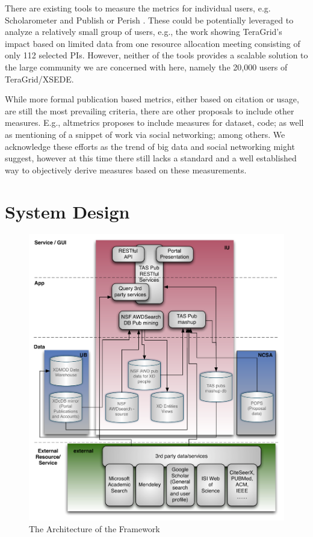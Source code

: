 \documentclass{sig-alternate}
\begin{document}
There are existing tools to measure the metrics for individual users, e.g. Scholarometer \cite{kaur2012scholarometer} and Publish or Perish \cite{www-pop}. These could be potentially leveraged to analyze a relatively small group of users, e.g., the work \cite{bollen2011and} showing TeraGrid's impact based on limited data from one resource allocation meeting consisting of  only 112 selected PIs. 
However, neither of the tools provides a scalable solution to the large community we are concerned with here, namely the 20,000 users of TeraGrid/XSEDE.  
 
While more formal publication based metrics, either based on citation or usage, are still the most prevailing criteria, there are other proposals to include other measures. E.g., altmetrics \cite{www-altmetrics} proposes to include measures for dataset, code; as well as mentioning of a snippet of work via social networking; among others. We acknowledge these efforts as the trend of big data and social networking might suggest, however at this time there still lacks a standard and a well established way to objectively derive measures based on these measurements. 
 
 
% 
 
% 
 
\section{System Design} \label{S:design}
 
\begin{figure}[htb] 
  \centering 
    \includegraphics[width=1.0\columnwidth]{images/tas-arch.pdf} 
  \caption{The Architecture of the Framework}\label{F:tas-arch} 
\end{figure} 
  
\end{document}
